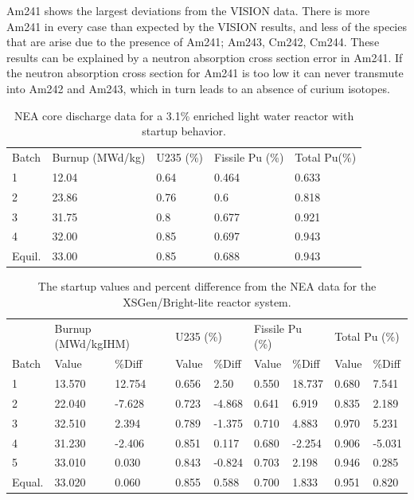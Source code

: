 \documentclass{article}
\begin{document}
Am241 shows the largest deviations from the VISION data. There is more Am241 in every case than expected by the VISION results, and less of the species that are arise due to the presence of Am241; Am243, Cm242, Cm244. These results can be explained by a neutron absorption cross section error in Am241. If the neutron absorption cross section for Am241 is too low it can never transmute into Am242 and Am243, which in turn leads to an absence of curium isotopes. 

\begin{table}[!htb]
\centering
\caption{NEA core discharge data for a 3.1\% enriched light water reactor with startup behavior.}
\label{tab:b}
\begin{tabular}{lllll}
Batch & Burnup (MWd/kg) & U235 (\%) & Fissile Pu (\%) & Total Pu(\%) \\
1 & 12.04 & 0.64 & 0.464 & 0.633 \\
2 & 23.86 & 0.76 & 0.6 & 0.818 \\
3 & 31.75 & 0.8 & 0.677 & 0.921 \\
4 & 32.00 & 0.85 & 0.697 & 0.943 \\
Equil. & 33.00 & 0.85 & 0.688 & 0.943
\end{tabular}
\end{table}

\begin{table}[!htb]
\centering
\caption{The startup values and percent difference from the NEA data for the XSGen/Bright-lite reactor system.}
\label{tab:c}
\begin{tabular}{lllllllll}
 & \multicolumn{2}{l}{Burnup (MWd/kgIHM)} & \multicolumn{2}{l}{U235 (\%)} & \multicolumn{2}{l}{Fissile Pu (\%)} & \multicolumn{2}{l}{Total Pu (\%)} \\
Batch & Value & \%Diff & Value & \%Diff & Value & \%Diff & Value & \%Diff \\
1 & 13.570 & 12.754 & 0.656 & 2.50 & 0.550 & 18.737 & 0.680 & 7.541 \\
2 & 22.040 & -7.628 & 0.723 & -4.868 & 0.641 & 6.919 & 0.835 & 2.189 \\
3 & 32.510 & 2.394 & 0.789 & -1.375 & 0.710 & 4.883 & 0.970 & 5.231 \\
4 & 31.230 & -2.406 & 0.851 & 0.117 & 0.680 & -2.254 & 0.906 & -5.031 \\
5 & 33.010 & 0.030 & 0.843 & -0.824 & 0.703 & 2.198 & 0.946 & 0.285 \\
Equal. & 33.020 & 0.060 & 0.855 & 0.588 & 0.700 & 1.833 & 0.951 & 0.820
\end{tabular}
\end{table}
\end{document}

